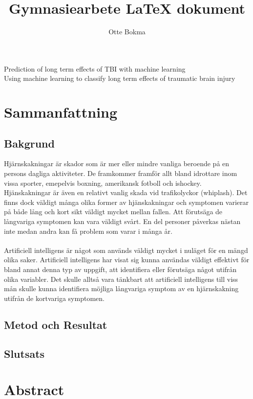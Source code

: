 \documentclass[11pt]{article}
\title{Gymnasiearbete {\LaTeX} dokument}
\author{Otte Bokma}
\begin{document}
\begin{titlepage}

  \begin{center}
    \huge{Prediction of long term effects of TBI with machine learning}
    \\[1cm]
    \large{Using machine learning to classify long term effects of traumatic brain injury}
  \end{center}
\end{titlepage}

\section*{Sammanfattning}

\subsection*{Bakgrund}

Hjärnskakningar är skador som är mer eller mindre vanliga beroende på en persons dagliga aktiviteter. De framkommer framför allt bland idrottare inom vissa sporter, emepelvis boxning, amerikansk fotboll och ishockey. Hjänskakningar är även en relativt vanlig skada vid trafikolyckor (whiplash). Det finns dock väldigt många olika former av hjänskakningar och symptomen varierar på både lång och kort sikt väldigt mycket mellan fallen. Att förutsäga de långvariga symptomen kan vara väldigt svårt. En del personer påverkas nästan inte medan andra kan få problem som varar i många år.\\
\\
Artificiell intelligens är något som används väldigt mycket i nuläget för en mängd olika saker. Artificiell intelligens har visat sig kunna användas väldigt effektivt för bland annat denna typ av uppgift, att identifiera eller förutsäga något utifrån olika variabler. Det skulle alltså vara tänkbart att artificiell intelligens till viss mån skulle kunna identifiera möjliga långvariga symptom av en hjärnskakning utifrån de kortvariga symptomen.

\subsection*{Metod och Resultat}

\subsection*{Slutsats}

\section*{Abstract}
\end{document}
